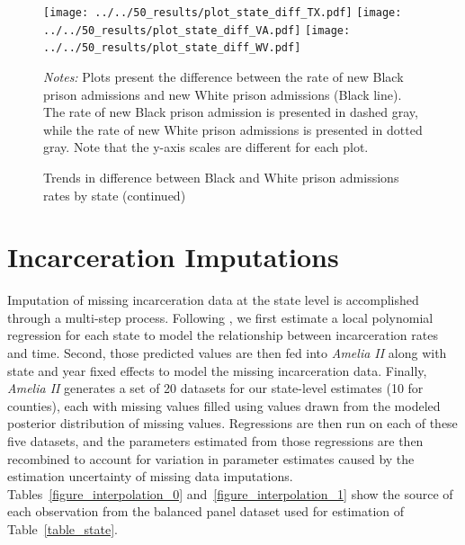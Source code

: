 \documentclass[12pt]{article}
\begin{document}
 \newpage
 \begin{figure}[h!]
 	\begin{center}
 	\caption{Trends in difference between Black and White prison admissions rates by state (continued)}
 	\small

 		\vspace{.1in}
 			\texttt{[image: ../../50\_results/plot\_state\_diff\_TX.pdf]}
 			\texttt{[image: ../../50\_results/plot\_state\_diff\_VA.pdf]}
       \texttt{[image: ../../50\_results/plot\_state\_diff\_WV.pdf]} \\
       \smallskip\smallskip\smallskip
 	\label{figure_difference_states2}
 	\end{center}
   {\scriptsize{\emph{Notes:} Plots present the difference between the rate of new Black prison admissions and new White prison admissions (Black line).  The rate of new Black prison admission is presented in dashed gray, while the rate of new White prison admissions is presented in dotted gray.  Note that the y-axis scales are different for each plot.}}
 \end{figure} \normalsize




 \section{Incarceration Imputations}\label{appendix_imputations}
 \setcounter{table}{0}
 \setcounter{figure}{0}
 \renewcommand{\thetable}{E\arabic{table}}
 \renewcommand{\thefigure}{E\arabic{figure}}
 \normalsize

Imputation of missing incarceration data at the state level is accomplished through a multi-step process. Following , we first estimate a local polynomial regression for each state to model the relationship between incarceration rates and time. Second, those predicted values are then fed into \emph{Amelia II}  along with state and year fixed effects to model the missing incarceration data. Finally, \emph{Amelia II} generates a set of 20 datasets for our state-level estimates (10 for counties), each with missing values filled using values drawn from the modeled posterior distribution of missing values. Regressions are then run on each of these five datasets, and the parameters estimated from those regressions are then recombined to account for variation in parameter estimates caused by the estimation uncertainty of missing data imputations. Tables~\ref{figure_interpolation_0} and~\ref{figure_interpolation_1} show the source of each observation from the balanced panel dataset used for estimation of Table~\ref{table_state}.
\end{document}

